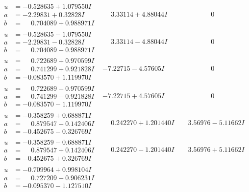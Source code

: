 \documentclass[1p]{elsarticle_modified}
\theoremstyle{definition}
\begin{document}
$$\begin{array}{c|c|c}
\begin{aligned}
u &= -0.528635 + 1.079550 I \\
a &= -2.29831 + 0.32828 I \\
b &= \phantom{-}0.704089 + 0.988971 I\end{aligned}
 & \phantom{-}3.33114 + 4.88044 I & \phantom{-0.000000 } 0 \\ \hline\begin{aligned}
u &= -0.528635 - 1.079550 I \\
a &= -2.29831 - 0.32828 I \\
b &= \phantom{-}0.704089 - 0.988971 I\end{aligned}
 & \phantom{-}3.33114 - 4.88044 I & \phantom{-0.000000 } 0 \\ \hline\begin{aligned}
u &= \phantom{-}0.722689 + 0.970599 I \\
a &= \phantom{-}0.741299 + 0.921828 I \\
b &= -0.083570 + 1.119970 I\end{aligned}
 & -7.22715 - 4.57605 I & \phantom{-0.000000 } 0 \\ \hline\begin{aligned}
u &= \phantom{-}0.722689 - 0.970599 I \\
a &= \phantom{-}0.741299 - 0.921828 I \\
b &= -0.083570 - 1.119970 I\end{aligned}
 & -7.22715 + 4.57605 I & \phantom{-0.000000 } 0 \\ \hline\begin{aligned}
u &= -0.358259 + 0.688871 I \\
a &= \phantom{-}0.879547 - 0.142406 I \\
b &= -0.452675 - 0.326769 I\end{aligned}
 & \phantom{-}0.242270 + 1.201440 I & \phantom{-}3.56976 - 5.11662 I \\ \hline\begin{aligned}
u &= -0.358259 - 0.688871 I \\
a &= \phantom{-}0.879547 + 0.142406 I \\
b &= -0.452675 + 0.326769 I\end{aligned}
 & \phantom{-}0.242270 - 1.201440 I & \phantom{-}3.56976 + 5.11662 I \\ \hline\begin{aligned}
u &= -0.709964 + 0.998104 I \\
a &= \phantom{-}0.727209 - 0.906231 I \\
b &= -0.095370 - 1.127510 I\end{aligned}

\end{array}$$
\end{document}
